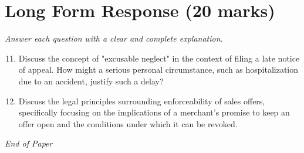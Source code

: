 \documentclass[12pt]{article}
\begin{document}
\section*{Long Form Response (20 marks)}
\textit{Answer each question with a clear and complete explanation.}
\begin{enumerate}[label=\arabic*.]
\setcounter{enumi}{10}
\item Discuss the concept of "excusable neglect" in the context of filing a late notice of appeal. How might a serious personal circumstance, such as hospitalization due to an accident, justify such a delay?
\item Discuss the legal principles surrounding enforceability of sales offers, specifically focusing on the implications of a merchant's promise to keep an offer open and the conditions under which it can be revoked.
\end{enumerate}

\vfill
\noindent\textit{End of Paper}
\end{document}

